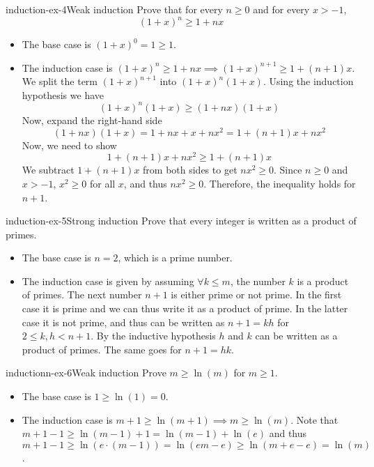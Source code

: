 \documentclass[preview]{standalone}
\begin{document}
\begin{snippetexercise}{induction-ex-4}{Weak induction}
    Prove that for every \(n \geq 0\) and for every \(x > -1\),
    \[
        {(1+x)}^n \geq 1 + nx
    \]
    \begin{itemize}
        \item The base case is \({(1+x)}^0 = 1 \geq 1\).
        \item The induction case is \({(1+x)}^n \geq 1 + nx \implies {(1+x)}^{n+1} \geq 1 + (n+1)x\).
            We split the term \({(1+x)}^{n+1}\) into \({(1+x)}^n(1+x)\).
            Using the induction hypothesis we have \[{(1+x)}^n(1+x) \geq (1+nx)(1+x)\]
            Now, expand the right-hand side \[(1+nx)(1+x) = 1 + nx + x + nx^2 = 1 + (n+1)x + nx^2\]
            Now, we need to show \[1+(n+1)x + nx^2 \geq 1 + (n+1)x\]
            We subtract \(1+(n+1)x\) from both sides to get \(nx^2 \geq 0\).
            Since \(n \geq 0\) and \(x > -1\), \(x^2 \geq 0\) for all \(x\), and thus \(nx^2 \geq 0\).
            Therefore, the inequality holds for \(n+1\).
    \end{itemize}
\end{snippetexercise}

\begin{snippetexercise}{induction-ex-5}{Strong induction}
    Prove that every integer is written as a product of primes.
    \begin{itemize}
        \item The base case is \(n=2\), which is a prime number.
        \item The induction case is given by assuming \(\forall k \leq m\),
        the number \(k\) is a product of primes. The next number \(n+1\)
        is either prime or not prime. In the first case it is prime and we can thus
        write it as a product of prime. In the latter case it is not prime, and thus can be written
        as \(n+1 = kh\) for \(2\leq k,h< n+1\).
        By the inductive hypothesis \(h\) and \(k\) can be written as a product of primes.
        The same goes for \(n+1=hk\). 
    \end{itemize}
\end{snippetexercise}

\begin{snippetexercise}{inductionn-ex-6}{Weak induction}
    Prove \(m \geq \ln(m)\) for \(m \geq 1\).
    \begin{itemize}
        \item The base case is \(1 \geq \ln(1)=0\).
        \item The induction case is \(m + 1\geq \ln(m + 1) \implies m \geq \ln(m)\).
        Note that \(m + 1 - 1 \geq \ln(m-1) + 1 = \ln(m-1) + \ln(e)\)
        and thus \(m + 1 - 1 \geq \ln(e\cdot(m-1)) = \ln(em-e) \geq \ln(m + e - e) = \ln(m)\).
    \end{itemize}
\end{snippetexercise}
\end{document}
